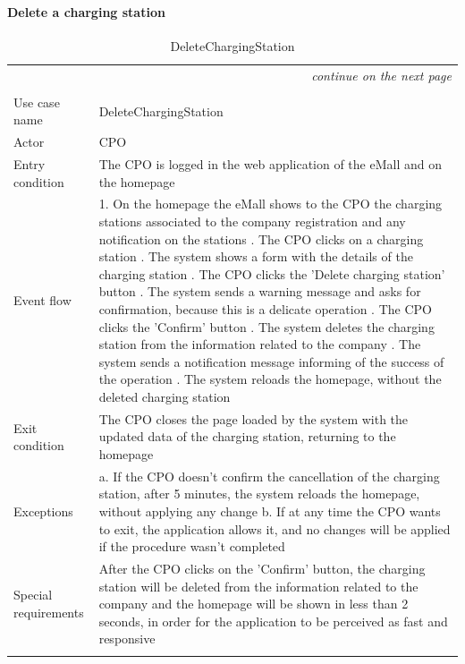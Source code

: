 \paragraph{Delete a charging station}
\begin{center}
    \begin{longtable}{p{4cm} p{11cm}}
    \multicolumn{2}{r}{\itshape{continue on the next page}}\\
    \endfoot 
    \\
    \endlastfoot
    \hline
     Use case name &  DeleteChargingStation\\
     \hline
     Actor & CPO \\
     \hline
     Entry condition & The CPO is logged in the web application of the eMall and on the homepage \\
     \hline
     Event flow &   1. On the homepage the eMall shows to the CPO the charging stations associated to the company                   registration and any notification on the stations \newline
                    2. The CPO clicks on a charging station \newline 
                    3. The system shows a form with the details of the charging station \newline
                    4. The CPO clicks the 'Delete charging station' button \newline
                    5. The system sends a warning message and asks for confirmation, because this is a delicate operation \newline
                    6. The CPO clicks the 'Confirm' button \newline
                    7. The system deletes the charging station from the information related to the company \newline
                    8. The system sends a notification message informing of the success of the operation \newline
                    9. The system reloads the homepage, without the deleted charging station\\
     \hline
     Exit condition &  The CPO closes the page loaded by the system with the updated data of the charging station, returning to the homepage \\
     \hline
     Exceptions &   a. If the CPO doesn't confirm the cancellation of the charging station, after 5 minutes, the                    system reloads the homepage, without applying any change \newline
                    b. If at any time the CPO wants to exit, the application allows it, and no changes will be applied if the procedure wasn't completed \\
     \hline
     Special requirements & After the CPO clicks on the 'Confirm' button, the charging station will be deleted from the information related to the company and the homepage will be shown in less than 2 seconds, in order for the application to be perceived as fast and responsive \\
     \hline
    \caption{DeleteChargingStation}
    \label{tab:DeleteChargingStation}
    \end{longtable}
\end{center}

